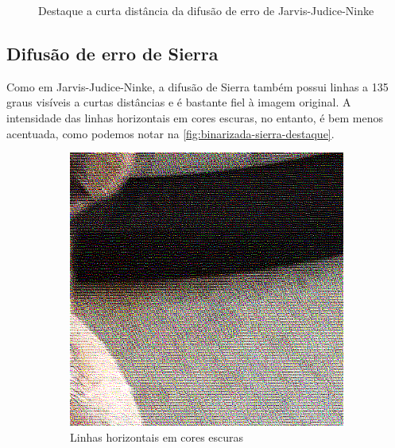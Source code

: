 \documentclass[brazilian,a4paper,twocolumn]{article}
\begin{document}
\begin{figure}
            \caption{Destaque a curta distância da difusão de erro de Jarvis-Judice-Ninke}
            \label{fig:binarizada-jarvis_judice_ninke-destaque}
        \end{figure}

    \subsection{Difusão de erro de Sierra}

        Como em Jarvis-Judice-Ninke, a difusão de Sierra também possui linhas a 135 graus visíveis a curtas distâncias e é bastante fiel à imagem original. A intensidade das linhas horizontais em cores escuras, no entanto, é bem menos acentuada, como podemos notar na \cref{fig:binarizada-sierra-destaque}.

        \begin{figure}
            \centering
            \begin{subfigure}{0.24\textwidth}
                \includegraphics[width=\textwidth,keepaspectratio]{../imgs/mel_binarizada-sierra-detalhe1.png}
                \caption{Linhas horizontais em cores escuras}
            \end{subfigure}
            \begin{subfigure}{0.24\textwidth}

\end{subfigure}
\end{figure}
\end{document}
